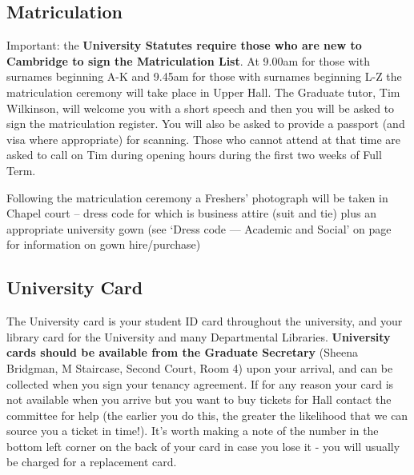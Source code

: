 \documentclass[11pt,fleqn, oneside]{book} %
\begin{document}
\subsection{Matriculation}

Important: the \textbf{University Statutes require those who are new to Cambridge to sign the Matriculation List}.  At 9.00am for those with surnames beginning A-K and 9.45am for those with surnames beginning L-Z the matriculation ceremony will take place in Upper Hall. The Graduate tutor, Tim Wilkinson, will welcome you with a short speech and then you will be asked to sign the matriculation register. You will also be asked to provide a passport (and visa where appropriate) for scanning. Those who cannot attend at that time are asked to call on Tim during opening hours during the first two weeks of Full Term. 

Following the matriculation ceremony a Freshers’ photograph will be taken in Chapel court – dress code for which is business attire (suit and tie) plus an appropriate university gown (see ‘Dress code — Academic and Social’ on page~\pageref{dress} for information on gown hire/purchase)

\subsection{University Card}

The University card is your student ID card throughout the university, and your library card for the University and many Departmental Libraries. \textbf{University cards should be available from the Graduate Secretary} (Sheena Bridgman, M Staircase, Second Court, Room 4) upon your arrival, and can be collected when you sign your tenancy agreement. If for any reason your card is not available when you arrive but you want to buy tickets for Hall contact the committee for help (the earlier you do this, the greater the likelihood that we can source you a ticket in time!).  It’s worth making a note of the number in the bottom left corner on the back of your card in case you lose it - you will usually be charged for a replacement card.
\end{document}
